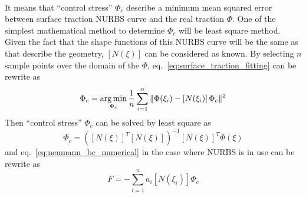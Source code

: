 \paragraph{}
It means that ``control stress'' $\Phi_c$ describe a minimum mean squared error between surface traction NURBS curve and the real
    traction $\Phi$.
One of the simplest mathematical method to determine $\Phi_c$ will be least square method.
Given the fact that the shape functions of this NURBS curve will be the same as that describe the geometry, $\left[ N(\xi) \right]$
    can be considered as known.
By selecting $n$ sample points over the domain of the $\Phi$, eq.~\ref{eq:surface_traction_fitting} can be rewrite as
    \begin{equation}
        \Phi_c = \operatorname*{arg\,min}_{\Phi_c}
            \frac{1}{n}
            \sum_{i=1}^n
            \|
                \Phi(\xi_i)-
                    \left[ N(\xi_i) \right]
                    \Phi_c
            \|^2
    \label{eq:surface_traction_fitting_discrete}
    \end{equation}
Then ``control stress'' $\Phi_c$ can be solved by least square as
    \begin{equation}
        \Phi_c= \left(
            \left[ N(\xi) \right] ^T
            \left[ N(\xi) \right]
        \right)^{-1}
        \left[ N(\xi) \right]^T
        \Phi(\xi)
    \end{equation}
and eq.~\ref{eq:neumann_bc_numerical} in the case where NURBS is in use can be rewrite as
    \begin{equation}
        {F}=-\sum_{i=1}^n
        a_i
        [N(\xi_i)]
        \Phi_c
    \label{eq:neumann_bc_numerical_NURBS}
    \end{equation}
\pagebreak
